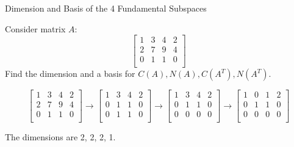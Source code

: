 \documentclass{beamer}
\begin{document}
\begin{frame}{Dimension and Basis of the 4 Fundamental Subspaces}
\begin{example}
Consider matrix $A$:
\begin{equation*}
    \left[ \begin{matrix}
        1&		3&		4&		2\\
        2&		7&		9&		4\\
        0&		1&		1&		0\\
    \end{matrix} \right]
\end{equation*}
Find the dimension and a basis for $C(A), N(A), C(A^T), N(A^T)$.
\end{example}
\begin{equation*}
    \left[ \begin{matrix}
        1&		3&		4&		2\\
        2&		7&		9&		4\\
        0&		1&		1&		0\\
    \end{matrix} \right] \rightarrow \left[ \begin{matrix}
        1&		3&		4&		2\\
        0&		1&		1&		0\\
        0&		1&		1&		0\\
    \end{matrix} \right] \rightarrow \left[ \begin{matrix}
        1&		3&		4&		2\\
        0&		1&		1&		0\\
        0&		0&		0&		0\\
    \end{matrix} \right] \rightarrow \left[ \begin{matrix}
        1&		0&		1&		2\\
        0&		1&		1&		0\\
        0&		0&		0&		0\\
    \end{matrix} \right]
\end{equation*}

The dimensions are 2, 2, 2, 1.
\end{frame}
\end{document}
